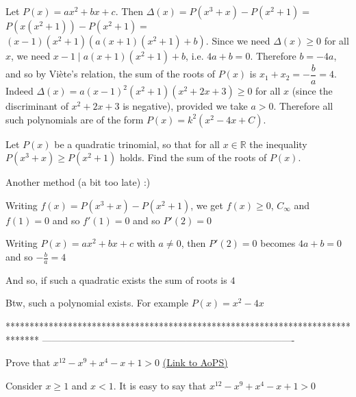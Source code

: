 \begin{solution}
	Let $P(x) = ax^2+bx+c$. Then $\Delta(x) = P(x^3+x) - P(x^2+1) =$ $ P(x(x^2+1)) - P(x^2+1) =$ $ (x-1)(x^2+1)(a(x+1)(x^2+1) + b)$. Since we need $\Delta(x) \geq 0$ for all $x$, we need $x-1 \mid a(x+1)(x^2+1) + b$, i.e. $4a + b = 0$. Therefore $b= -4a$, and so by Viète's relation, the sum of the roots of $P(x)$ is $\boxed{x_1 + x_2 = -\dfrac {b} {a} = 4}$.
Indeed $\Delta(x) = a(x-1)^2(x^2+1)(x^2+2x +3) \geq 0$ for all $x$ (since the discriminant of $x^2+2x +3$ is negative), provided we take $a>0$. Therefore all such polynomials are of the form $P(x) = k^2(x^2 - 4x + C)$.
\end{solution}



\begin{solution}
	\begin{tcolorbox}Let $P(x)$ be a quadratic trinomial, so that for all $x\in \mathbb{R}$ the inequality $P(x^3+x)\geq P(x^2+1)$ holds. Find the sum of the roots of $P(x)$.\end{tcolorbox}
Another method (a bit too late) :)

Writing $f(x)=P(x^3+x)-P(x^2+1)$, we get $f(x)\ge 0$, $C_{\infty}$ and $f(1)=0$ and so $f'(1)=0$ and so $P'(2)=0$

Writing $P(x)=ax^2+bx+c$ with $a\ne 0$, then $P'(2)=0$ becomes $4a+b=0$ and so $-\frac ba=4$

And so, if such a quadratic exists the sum of roots is $\boxed{4}$

Btw, such a polynomial exists. For example $P(x)=x^2-4x$
\end{solution}
*******************************************************************************
-------------------------------------------------------------------------------

\begin{problem}
	Prove that $x^{12}-x^{9}+x^4-x+1 > 0$
	\flushright \href{https://artofproblemsolving.com/community/c6h490139}{(Link to AoPS)}
\end{problem}



\begin{solution}
	Consider $x \ge 1$ and $x<1$. It is easy to say that 
$ x^{12}-x^{9}+x^{4}-x+1 > 0 $
\end{solution}



